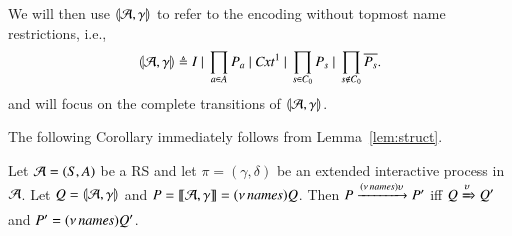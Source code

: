 We will then use $\llparenthesis{\cal A},\gamma\rrparenthesis$ to refer to the encoding without topmost name restrictions, i.e.,
$$
\llparenthesis{\cal A},\gamma\rrparenthesis \triangleq 
I~|~ \prod_{a\in A} P_a ~|~  \mathit{Cxt}^1~|~\prod_{s\in C_0}P_{s} ~|~ \prod_{s \notin C_0}\overline{P_s} .
$$
and will focus on the complete transitions of $\llparenthesis{\cal A},\gamma\rrparenthesis$.

The following Corollary immediately follows from Lemma~\ref{lem:struct}.

\begin{corollary}
Let ${\cal A} = (S, A)$ be a RS and let $\pi=(\gamma,\delta)$ be an extended  interactive process in ${\cal A}$. 
Let $Q=\llparenthesis{\cal A},\gamma\rrparenthesis$ and $P= \llbracket{\cal A},\gamma\rrbracket = (\nu\, \mathit{names})Q$. 
Then $P \xrightarrow{(\nu\, \mathit{names})\upsilon} P'$ iff $Q \xRightarrow{\upsilon} Q'$ and $P'=(\nu\, \mathit{names})Q'$.
\end{corollary}


